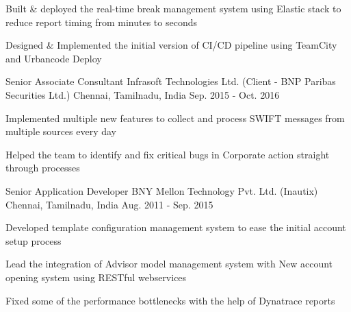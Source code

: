\begin{cventries}
{\begin{cvitems}
        \item {Built \& deployed the real-time break management system using Elastic stack to reduce report timing from minutes to seconds}
        \item {Designed \& Implemented the initial version of CI/CD pipeline using TeamCity and Urbancode Deploy}        
      \end{cvitems}
    }
  \cventry
    {Senior Associate Consultant} %
    {Infrasoft Technologies Ltd. (Client - BNP Paribas Securities Ltd.)} %
    {Chennai, Tamilnadu, India} %
    {Sep. 2015 - Oct. 2016} %
    {
      \begin{cvitems} %
        \item {Implemented multiple new features to collect and process SWIFT messages from multiple sources every day}
        \item {Helped the team to identify and fix critical bugs in Corporate action straight through processes}        
      \end{cvitems}
    }
  \cventry
    {Senior Application Developer} %
    {BNY Mellon Technology Pvt. Ltd. (Inautix)} %
    {Chennai, Tamilnadu, India} %
    {Aug. 2011 - Sep. 2015} %
    {
      \begin{cvitems} %
        \item {Developed template configuration management system to ease the initial account setup process}
        \item {Lead the integration of Advisor model management system with New account opening system using RESTful webservices}
        \item {Fixed some of the performance bottlenecks with the help of Dynatrace reports}
      \end{cvitems}
    }
\end{cventries}

